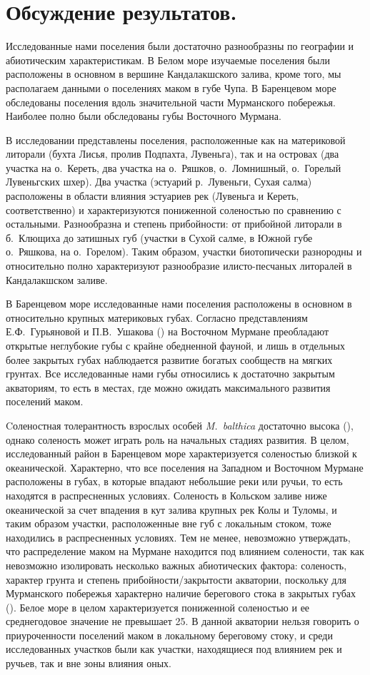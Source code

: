 		\chapter{Обсуждение результатов.}
Исследованные нами поселения были достаточно разнообразны по географии и абиотическим характеристикам.
В Белом море изучаемые поселения были расположены в основном в вершине Кандалакшского залива, кроме того, мы располагаем данными о поселениях маком в губе Чупа. 
В Баренцевом море обследованы поселения вдоль значительной части Мурманского побережья.
Наиболее полно были обследованы губы Восточного Мурмана.

В исследовании представлены поселения, расположенные как на материковой литорали (бухта Лисья, пролив Подпахта, Лувеньга), так и на островах (два участка на о.~Кереть, два участка на о.~Ряшков, о.~Ломнишный, о.~Горелый Лувеньгских шхер). 
Два участка (эстуарий р.~Лувеньги, Сухая салма) расположены в области влияния эстуариев рек (Лувеньга и Кереть, соответственно)  и характеризуются пониженной соленостью по сравнению с остальными.
Разнообразна и степень прибойности: от прибойной литорали в б.~Клющиха до затишных губ (участки в Сухой салме, в Южной губе о.~Ряшкова, на о.~Горелом).
Таким образом, участки биотопически разнородны и относительно полно характеризуют разнообразие илисто-песчаных литоралей в Кандалакшском заливе.

В Баренцевом море исследованные нами поселения расположены в основном в относительно крупных материковых губах.
Согласно представлениям Е.Ф.~Гурьяновой и П.В.~Ушакова (\cite{Guryanova_Ushakov_1929}) на Восточном Мурмане преобладают открытые неглубокие губы с крайне обедненной фауной, и лишь в отдельных более закрытых губах наблюдается развитие богатых сообществ на мягких грунтах.
Все исследованные нами губы относились к достаточно закрытым акваториям, то есть в местах, где можно ожидать максимального развития поселений маком.

Cоленостная толерантность взрослых особей {\it M.~balthica} достаточно высока (\cite{Naumov_2006}), однако соленость может играть роль на начальных стадиях развития.
В целом, исследованный район в Баренцевом море характеризуется соленостью близкой к океанической.
Характерно, что все поселения на Западном и Восточном Мурмане расположены в губах, в которые впадают небольшие реки или ручьи, то есть находятся в распресненных условиях.
Соленость в Кольском заливе ниже океанической за счет впадения в кут залива крупных рек Колы и Туломы, и таким образом участки, расположенные вне губ с локальным стоком, тоже находились в распресненных условиях.
Тем не менее, невозможно утверждать, что распределение маком на Мурмане находится под влиянием солености, так как невозможно изолировать несколько важных абиотических фактора: соленость, характер грунта и степень прибойности/закрытости акватории, поскольку для Мурманского побережья характерно наличие берегового стока в закрытых губах (\cite{Guryanova_Ushakov_1929, Guryanova_et_al_1930}).
Белое море в целом характеризуется пониженной соленостью и ее среднегодовое значение не превышает 25\permil.
В данной акватории нельзя говорить о приуроченности поселений маком в локальному береговому стоку, и среди исследованных участков были как участки, находящиеся под влиянием рек и ручьев, так и вне зоны влияния оных.


